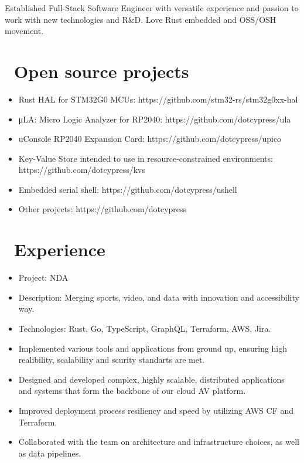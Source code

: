 \documentclass{resume}
\begin{document}



Established Full-Stack Software Engineer with versatile experience and passion to work with new technologies and R\&D. Love Rust embedded and OSS/OSH movement. 

\section{\faHeart\ Open source projects}

\begin{itemize}
  \item Rust HAL for STM32G0 MCUs: https://github.com/stm32-rs/stm32g0xx-hal
  \item μLA: Micro Logic Analyzer for RP2040: https://github.com/dotcypress/ula
  \item uConsole RP2040 Expansion Card: https://github.com/dotcypress/upico
  \item Key-Value Store intended to use in resource-constrained environments: https://github.com/dotcypress/kvs
  \item Embedded serial shell: https://github.com/dotcypress/ushell
  \item Other projects: https://github.com/dotcypress
\end{itemize}

\section{\faUsers\ Experience}
\role{Senior Software Engineer}

\begin{itemize}
  \item Project: NDA
  \item Description: Merging sports, video, and data with innovation and accessibility way.
  \item Technologies: Rust, Go, TypeScript, GraphQL, Terraform, AWS, Jira.
  \item Implemented various tools and applications from ground up, ensuring high realibility, scalability and scurity standarts are met.
  \item Designed and developed complex, highly scalable, distributed applications and systems that form the backbone of our cloud AV platform.
  \item Improved deployment process resiliency and speed by utilizing AWS CF and Terraform.
  \item Collaborated with the team on architecture and infrastructure choices, as well as data pipelines.
\end{itemize}
\end{document}
